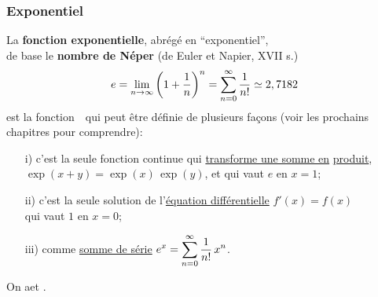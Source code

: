 \begin{frame}
\frametitle{\bf Exponentiel}
\medskip 

\begin{itemize}
\bitem
La {\bf fonction exponentielle}, abr\'eg\'e en ``exponentiel'', \\ 
de base le {\bf nombre de N\'eper} 
{\small (de Euler et Napier, XVII s.)}
\vspace*{-2mm}
$$
e=\lim_{n\rightarrow\infty} \left(1+\frac{1}{n}\right)^n 
= \sum_{n=0}^\infty \frac{1}{n!} \simeq 2,7182
\vspace*{-2mm}
$$
est la fonction\ \ qui peut \^etre d\'efinie 
de plusieurs fa\c{c}ons (voir les prochains chapitres pour comprendre): 
\vspace*{2mm}

\begin{itemize}
\item[i)]
c'est la seule fonction continue qui \underline{transforme une somme en} 
\underline{produit}, $\exp(x+y)=\exp(x)\, \exp(y)$, et qui vaut $e$ en $x=1$;
\vspace*{3mm}

\item[ii)]
c'est la seule solution de l'\underline{\'equation diff\'erentielle}\quad 
$f'(x)=f(x)$ \\ qui vaut $1$ en $x=0$;
\vspace*{3mm}

\item[iii)]
comme \underline{somme de s\'erie}\quad 
$\displaystyle e^x=\sum_{n=0}^\infty \frac{1}{n!}\,x^n$.
\end{itemize}
\vspace*{3mm}

On a\quad {}\quad et\quad 
\framebox{\ $I_{\exp}= ]0,\infty[$\ }. 
\end{itemize}

\end{frame}


